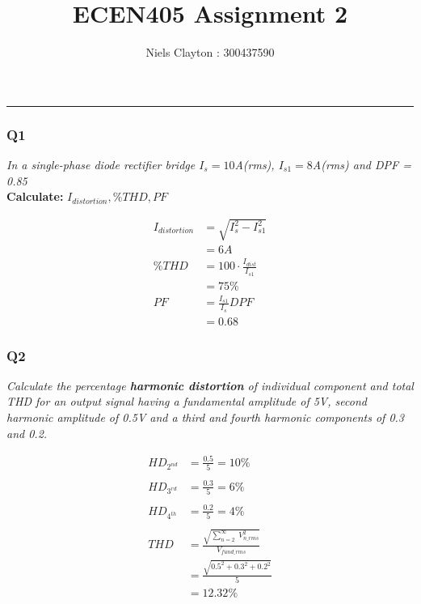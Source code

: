 \documentclass[a4paper,11pt]{article}
\begin{document}
\title{\LARGE{\textbf{ECEN405 Assignment 2}}}
\author{Niels Clayton : 300437590}
\date{}
\maketitle
\hrule

\subsubsection*{Q1}

\textit{In a single-phase diode rectifier bridge $I_s = 10$A(rms), $I_{s1}=8$A(rms) and DPF = 0.85}\\
\textbf{Calculate:} $I_{distortion}, \%THD, PF$

\begin{align*}
    I_{distortion} & = \sqrt{I_{s}^{2}-I_{s1}^{2}}     \\
                   & = 6A                              \\
    \%THD          & = 100\cdot\frac{I_{dist}}{I_{s1}} \\
                   & = 75\%                            \\
    PF             & = \frac{I_{s1}}{I_{s}}DPF         \\
                   & = 0.68
\end{align*}

\subsubsection*{Q2}
\textit{Calculate the percentage \textbf{harmonic distortion} of individual component and total THD for an output signal having a fundamental amplitude of 5V, second harmonic amplitude of 0.5V and a third and fourth harmonic components of 0.3 and 0.2.}

\begin{align*}
    HD_{2^{nd}} & = \frac{0.5}{5} = 10\%                                                \\\\
    HD_{3^{rd}} & = \frac{0.3}{5} = 6\%                                                 \\\\
    HD_{4^{th}} & = \frac{0.2}{5} = 4\%                                                 \\\\
    THD         & = \frac{\sqrt{ \sum_{n=2}^{\infty} \; V^2_{n\_rms} }}{ V_{fund\_rms}} \\
                & = \frac{\sqrt{ 0.5^2 + 0.3^2 + 0.2^2 }}{ 5 }                          \\
                & = 12.32\%
\end{align*}
\end{document}
